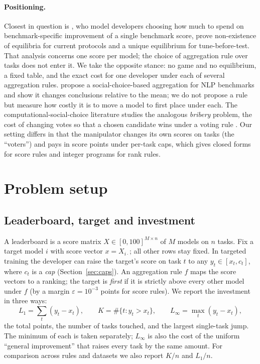 \documentclass{article}
\begin{document}
\paragraph{Positioning.}
Closest in question is \citet{chen2026incentives}, who model developers choosing how much to spend on benchmark-specific improvement of a single benchmark score, prove non-existence of equilibria for current protocols and a unique equilibrium for tune-before-test. That analysis concerns one score per model; the choice of aggregation rule over tasks does not enter it. We take the opposite stance: no game and no equilibrium, a fixed table, and the exact cost for one developer under each of several aggregation rules. \citet{colombo2022best} propose a social-choice-based aggregation for NLP benchmarks and show it changes conclusions relative to the mean; we do not propose a rule but measure how costly it is to move a model to first place under each. The computational-social-choice literature studies the analogous \emph{bribery} problem, the cost of changing votes so that a chosen candidate wins under a voting rule \citep{faliszewski2009bribery,brandt2016handbook}. Our setting differs in that the manipulator changes its own scores on tasks (the ``voters'') and pays in score points under per-task caps, which gives closed forms for score rules and integer programs for rank rules.

\section{Problem setup}
\label{sec:setup}
\subsection{Leaderboard, target and investment}
A leaderboard is a score matrix $X\in[0,100]^{M\times n}$ of $M$ models on $n$ tasks. Fix a target model $i$ with score vector $x=X_{i\cdot}$; all other rows stay fixed. In targeted training the developer can raise the target's score on task $t$ to any $y_t\in[x_t,c_t]$, where $c_t$ is a \emph{cap} (Section~\ref{sec:caps}). An aggregation rule $f$ maps the score vectors to a ranking; the target is \emph{first} if it is strictly above every other model under $f$ (by a margin $\varepsilon=10^{-3}$ points for score rules). We report the investment in three ways:
\[
L_1=\sum_t (y_t-x_t),\qquad K=\#\{t: y_t>x_t\},\qquad L_\infty=\max_t (y_t-x_t),
\]
the total points, the number of tasks touched, and the largest single-task jump. The minimum of each is taken separately; $L_\infty$ is also the cost of the uniform ``general improvement'' that raises every task by the same amount. For comparison across rules and datasets we also report $K/n$ and $L_1/n$.
\end{document}
